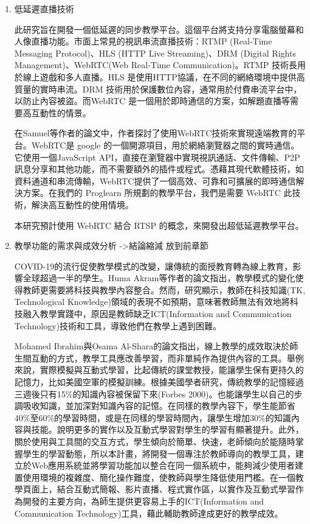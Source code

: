 \documentclass[12pt]{article}
\begin{document}
\begin{enumerate}
    \begin{enumerate}
      \setlength{\parindent}{2em}
      \item 低延遲直播技術
        \par 此研究旨在開發一個低延遲的同步教學平台。這個平台將支持分享電腦螢幕和人像直播功能。市面上常見的視訊串流直播技術：RTMP (Real-Time Messaging Protocol)、HLS (HTTP Live Streaming)、DRM (Digital Rights Management)、WebRTC(Web Real-Time Communication)。RTMP 技術長用於線上遊戲和多人直播。HLS 是使用HTTP協議，在不同的網絡環境中提供高質量的實時串流。DRM 技術用於保護數位內容，通常用於付費串流平台中，以防止內容被盜。而WebRTC 是一個用於即時通信的方案，如解題直播等需要高互動性的情景。
        \par 在Samuel等作者的論文中，作者探討了使用WebRTC技術來實現遠端教育的平台。WebRTC是 google 的一個開源項目，用於網絡瀏覽器之間的實時通信。它使用一個JavaScript API，直接在瀏覽器中實現視訊通話、文件傳輸、P2P訊息分享和其他功能，而不需要額外的插件或程式。憑藉其現代軟體技術，如資料通道和串流傳輸，WebRTC提供了一個高效、可靠和可擴展的即時通信解決方案。在我們的 Proglearn 所規劃的教學平台，我們是需要 WebRTC 此技術，解決高互動性的使用情境。
        \par 本研究預計使用 WebRTC 結合 RTSP 的概念，來開發出超低延遲教學平台。
      \item 教學功能的需求與成效分析 ->結論縮減 放到前章節
        \par COVID-19的流行促使教學模式的改變，讓傳統的面授教育轉為線上教育，影響全球超過一半的學生。Huma Akram等作者的論文指出，教學模式的變化使得教師更需要將科技與教學內容整合。然而，研究顯示，教師在科技知識(TK, Technological Knowledge)領域的表現不如預期，意味著教師無法有效地將科技融入教學實踐中，原因是教師缺乏ICT(Information and Communication Technology)技術和工具，導致他們在教學上遇到困難。
        \par Mohamed Ibrahim與Osama Al-Shara的論文指出，線上教學的成效取決於師生間互動的方式，教學工具應改善學習，而非單純作為提供內容的工具。舉例來說，實際模擬與互動式學習，比起傳統的課堂教授，能讓學生保有更持久的記憶力，比如美國空軍的模擬訓練。根據美國學者研究，傳統教學的記憶經過三週後只有15\%的知識內容被保留下來(Forbes 2000)。也能讓學生以自己的步調吸收知識，並加深對知識內容的記憶。在同樣的教學內容下，學生能節省40\%至60\%的學習時間，或是在同樣的學習時間內，讓學生增加30\%的知識內容與技能。說明更多的實作以及互動式學習對學生的學習有顯著提升。此外，關於使用與工具間的交互方式，學生傾向於簡單、快速，老師傾向於能隨時掌握學生的學習動態，所以本計畫，將開發一個專注於教師導向的教學工具，建立於Web應用系統並將學習功能加以整合在同一個系統中，能夠減少使用者建置使用環境的複雜度、簡化操作難度，使教師與學生降低使用門檻。在一個教學頁面上，結合互動式簡報、影片直播、程式實作區，以實作及互動式學習作為開發的主要方向，為師生提供更容易上手的ICT(Information and Communication Technology)工具，藉此輔助教師達成更好的教學成效。

\end{enumerate}
\end{enumerate}
\end{document}
